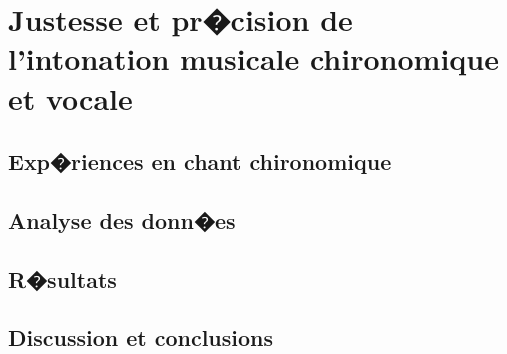\chapter{Justesse et pr�cision de l'intonation musicale chironomique et vocale}
\label{Sec:JustessePrecision}
\minitoc
\cleardoublepage


\section{Exp�riences en chant chironomique}
\lipsum[1-2]

\section{Analyse des donn�es}
\lipsum[1-2]

\section{R�sultats}
\lipsum[1-2]
\section{Discussion et conclusions}
\lipsum[1-2]